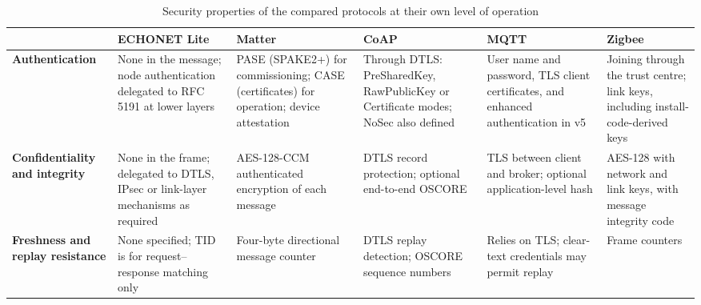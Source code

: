 \begin{table}[htbp]
  \centering
  \caption{Security properties of the compared protocols at their own level of operation}
  \label{tab:compare-security}
  \scriptsize
  \setlength{\tabcolsep}{3pt}
  \renewcommand{\arraystretch}{1.2}
  \begin{tabularx}{\textwidth}{@{}>{\raggedright\arraybackslash}p{2.1cm} >{\raggedright\arraybackslash}X >{\raggedright\arraybackslash}X >{\raggedright\arraybackslash}X >{\raggedright\arraybackslash}X >{\raggedright\arraybackslash}X@{}}
    \toprule
     & \textbf{ECHONET Lite}                                                                                                      & \textbf{Matter} & \textbf{CoAP} & \textbf{MQTT} & \textbf{Zigbee} \\
    \midrule
    \textbf{Authentication}
     & None in the message; node authentication delegated to RFC 5191 at lower layers \cite{ECHONETPart2}
     & PASE (SPAKE2+) for commissioning; CASE (certificates) for operation; device attestation \cite{Zohdi2026,SiliconLabsMatter}
     & Through DTLS: PreSharedKey, RawPublicKey or Certificate modes; NoSec also defined \cite{RFC7252}
     & User name and password, TLS client certificates, and enhanced authentication in v5 \cite{MQTT5}
     & Joining through the trust centre; link keys, including install-code-derived keys \cite{SiliconLabsZigbee}                                                                                      \\
    \addlinespace
    \textbf{Confidentiality and integrity}
     & None in the frame; delegated to DTLS, IPsec or link-layer mechanisms as required \cite{ECHONETPart2,ECHONETGuidelines}
     & AES-128-CCM authenticated encryption of each message \cite{Zohdi2026,Losty2026}
     & DTLS record protection; optional end-to-end OSCORE \cite{RFC6347,RFC8613}
     & TLS between client and broker; optional application-level hash \cite{MQTT5}
     & AES-128 with network and link keys, with message integrity code \cite{SiliconLabsZigbee,Marksteiner2017}                                                                                       \\
    \addlinespace
    \textbf{Freshness and replay resistance}
     & None specified; TID is for request--response matching only \cite{ECHONETPart2}
     & Four-byte directional message counter \cite{Zohdi2026}
     & DTLS replay detection; OSCORE sequence numbers \cite{RFC6347,RFC8613}
     & Relies on TLS; clear-text credentials may permit replay \cite{MQTT5}
     & Frame counters \cite{SiliconLabsZigbee,Marksteiner2017}                                                                                                                                        \\

\end{tabularx}
\end{table}
